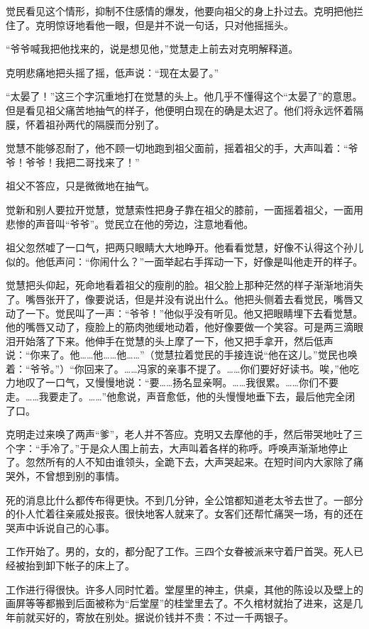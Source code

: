 \par 觉民看见这个情形，抑制不住感情的爆发，他要向祖父的身上扑过去。克明把他拦住了。克明惊讶地看他一眼，但是并不说一句话，只对他摇摇头。
\par “爷爷喊我把他找来的，说是想见他，”觉慧走上前去对克明解释道。
\par 克明悲痛地把头摇了摇，低声说：“现在太晏了。”
\par “太晏了！”这三个字沉重地打在觉慧的头上。他几乎不懂得这个“太晏了”的意思。但是看见祖父痛苦地抽气的样子，他便明白现在的确是太迟了。他们将永远怀着隔膜，怀着祖孙两代的隔膜而分别了。
\par 觉慧不能够忍耐了，他不顾一切地跑到祖父面前，摇着祖父的手，大声叫着：“爷爷！爷爷！我把二哥找来了！”
\par 祖父不答应，只是微微地在抽气。
\par 觉新和别人要拉开觉慧，觉慧索性把身子靠在祖父的膝前，一面摇着祖父，一面用悲惨的声音叫“爷爷”。觉民立在他的旁边，注意地看他。
\par 祖父忽然嘘了一口气，把两只眼睛大大地睁开。他看看觉慧，好像不认得这个孙儿似的。他低声问：“你闹什么？”一面举起右手挥动一下，好像是叫他走开的样子。
\par 觉慧把头仰起，死命地看着祖父的瘦削的脸。祖父脸上那种茫然的样子渐渐地消失了。嘴唇张开了，像要说话，但是并没有说出什么。他把头侧着去看觉民，嘴唇又动了一下。觉民叫了一声：“爷爷！”他似乎没有听见。他又把眼睛埋下去看觉慧。他的嘴唇又动了，瘦脸上的筋肉弛缓地动着，他好像要做一个笑容。可是两三滴眼泪开始落了下来。他伸手在觉慧的头上摩了一下，他又把手拿开，然后低声说：“你来了。他……他……他……”（觉慧拉着觉民的手接连说“他在这儿。”觉民也唤着：“爷爷。”）“你回来了。……冯家的亲事不提了。……你们要好好读书。唉，”他吃力地叹了一口气，又慢慢地说：“要……扬名显亲啊。……我很累。……你们不要走。……我要走了。……”他愈说，声音愈低，他的头慢慢地垂下去，最后他完全闭了口。
\par 克明走过来唤了两声“爹”，老人并不答应。克明又去摩他的手，然后带哭地吐了三个字：“手冷了。”于是众人围上前去，大声叫着各样的称呼。呼唤声渐渐地停止了。忽然所有的人不知由谁领头，全跪下去，大声哭起来。在短时间内大家除了痛哭外，不曾想到别的事情。
\par 死的消息比什么都传布得更快。不到几分钟，全公馆都知道老太爷去世了。一部分的仆人忙着往亲戚处报丧。很快地客人就来了。女客们还帮忙痛哭一场，有的还在哭声中诉说自己的心事。
\par 工作开始了。男的，女的，都分配了工作。三四个女眷被派来守着尸首哭。死人已经被抬到卸下帐子的床上了。
\par 工作进行得很快。许多人同时忙着。堂屋里的神主，供桌，其他的陈设以及壁上的画屏等等都搬到后面被称为“后堂屋”的桂堂里去了。不久棺材就抬了进来，这是几年前就买好的，寄放在别处。据说价钱并不贵：不过一千两银子。
